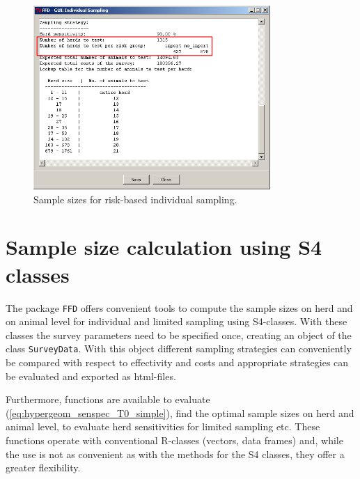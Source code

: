 \documentclass[nojss]{jss}
\begin{document}
\begin{figure}[h!t]
\begin{center}
\includegraphics[width=90mm]{GUI_calc_ind_risk.png}
\end{center} \caption{Sample sizes for risk-based individual sampling.} \label{fig:GUI_calc_ind_risk}
\end{figure}

\clearpage

\section{Sample size calculation using S4 classes} %
\label{sec:using-ffd-S4}

The package \texttt{FFD} offers convenient tools to compute the sample sizes on herd and on animal level for individual and limited sampling using S4-classes. With these classes the survey parameters need to be specified once, creating an object of the class \texttt{SurveyData}. With this object different sampling strategies can conveniently be compared with respect to effectivity and costs and appropriate strategies can be evaluated and exported as html-files.

Furthermore, functions are available to evaluate (\ref{eq:hypergeom_senspec_T0_simple}), find the optimal sample sizes on herd and animal level, to evaluate herd sensitivities for limited sampling etc. These functions operate with conventional R-classes (vectors, data frames) and, while the use is not as convenient as with the methods for the S4 classes, they offer a greater flexibility.
\end{document}
